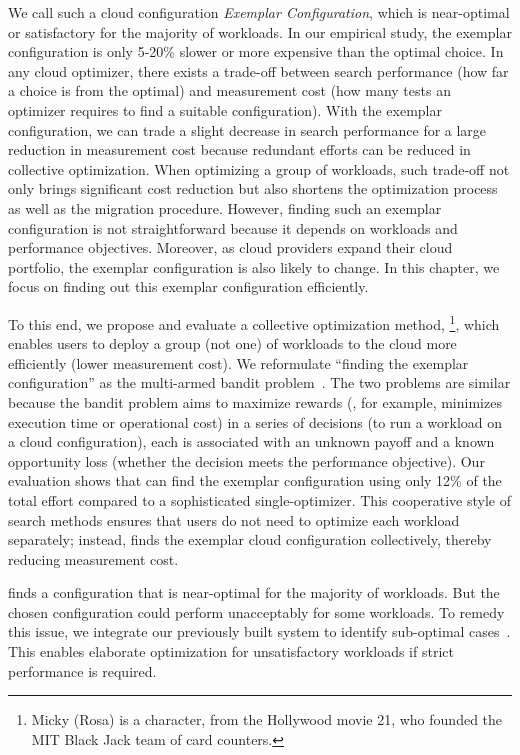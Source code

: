 We call such a cloud configuration \textit{Exemplar Configuration}, which is near-optimal or satisfactory for the majority of workloads.
In our empirical study, the exemplar configuration is only 5-20\% slower or more expensive than the optimal choice.
In any cloud optimizer, there exists a trade-off between search performance (how far a choice is from the optimal) and measurement cost (how many tests an optimizer requires to find a suitable configuration).
With the exemplar configuration,
we can trade a slight decrease in search performance for a large reduction in measurement cost because
redundant efforts can be reduced in collective optimization.
When optimizing a group of workloads,
such trade-off not only brings significant cost reduction but also shortens the optimization process as well as the migration procedure.
However, finding such an exemplar configuration is not straightforward because it depends on workloads and performance objectives.
Moreover, as cloud providers expand their cloud portfolio, the exemplar configuration is also likely to change.
In this chapter, we focus on finding out this exemplar configuration efficiently.

To this end, we propose and evaluate a collective optimization method, \micky\footnote{Micky (Rosa) is a  character, from the Hollywood movie 21, who founded the MIT Black Jack team of card counters.}, which enables users to deploy a group (not one) of workloads to the cloud more efficiently (lower measurement cost).
We reformulate ``finding the exemplar configuration'' as the multi-armed bandit problem~\cite{weber1992gittins,bergemann2006bandit,audibert2011introduction,dambreville2017load,jiang2017pytheas}.
The two problems are similar because
the bandit problem aims to maximize rewards (\micky, for example, minimizes execution time or operational cost) in a series of decisions (to run a workload on a cloud configuration), each is associated with an unknown payoff and a known opportunity loss (whether the decision meets the performance objective).
Our evaluation shows that \micky can find the exemplar configuration using only 12\% of the total effort compared to a sophisticated single-optimizer.
This cooperative style of search methods ensures that users do not need to optimize each workload separately; instead, finds the exemplar cloud configuration collectively, thereby reducing measurement cost. 

\micky finds a configuration that is near-optimal for the majority of workloads.
But the chosen configuration could perform unacceptably for some workloads.
To remedy this issue,
we integrate our previously built system \scout
to identify sub-optimal cases~\cite{Hsu2018Scout}.
This enables elaborate optimization for unsatisfactory workloads if strict performance is required.

